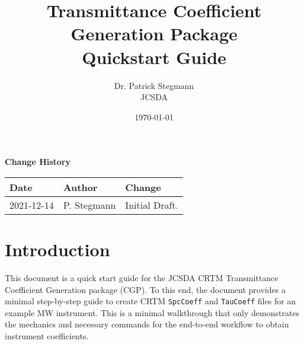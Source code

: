 

\title{Transmittance Coefficient Generation Package\\ \normalsize{Quickstart Guide}}
\author{Dr. Patrick Stegmann\\ JCSDA}
\date{\today}




\maketitle


\tableofcontents

\newpage

\thispagestyle{empty}
\vspace*{10cm}
\begin{center}
  {\sffamily\Large\bfseries Change History}
  \begin{table}[htp]
    \centering
    \begin{tabular}{|p{2cm}|p{3cm}|p{8cm}|}
      \hline
      \sffamily\textbf{Date} & \sffamily\textbf{Author} & \sffamily\textbf{Change}\\
      \hline\hline
      2021-12-14 & P. Stegmann& Initial Draft.\\
      \hline
    \end{tabular}
  \end{table}
\end{center}
\clearpage
{}
\setcounter{page}{1}


%

\section{Introduction}
This document is a quick start guide for the JCSDA CRTM Transmittance Coefficient Generation package (CGP).
To this end, the document provides a minimal step-by-step guide to create CRTM \verb|SpcCoeff| and \verb|TauCoeff| files for an example MW instrument. 
This is a minimal walkthrough that only demonstrates the mechanics and necessary commands for the end-to-end workflow to obtain instrument coefficients.


